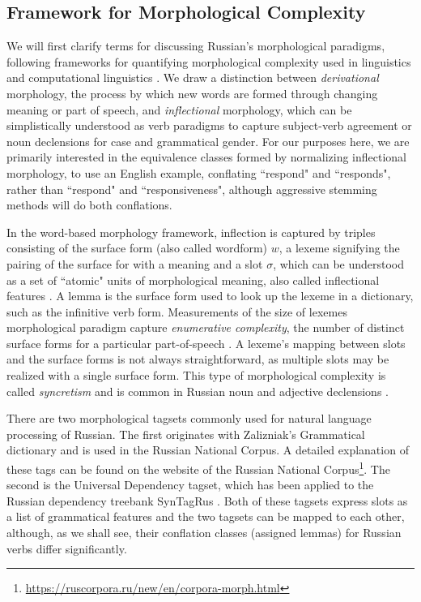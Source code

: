 \documentclass[11pt,a4paper]{article}
\begin{document}
\subsection{Framework for Morphological Complexity}
We will first clarify terms for discussing Russian's morphological paradigms, following frameworks for quantifying morphological complexity used in linguistics and computational linguistics \cite{baerman2015intro, cotterell-etal-2019-complexity}. We draw a distinction between \textit{derivational} morphology, the process by which new words are formed through changing meaning or part of speech, and \textit{inflectional} morphology, which can be simplistically understood as verb paradigms to capture subject-verb agreement or noun declensions for case and grammatical gender. For our purposes here, we are primarily interested in the equivalence classes formed by normalizing inflectional morphology, to use an English example, conflating ``respond" and ``responds", rather than ``respond" and ``responsiveness", although aggressive stemming methods will do both conflations.

In the word-based morphology framework, inflection is captured by triples consisting of the surface form (also called wordform) $w$, a lexeme  signifying the pairing of the surface for with a meaning and a slot $\sigma$, which can be understood as a set of ``atomic" units of morphological meaning, also called inflectional features \cite{aronoff1976word,sylak-glassman-etal-2015-language,cotterell-etal-2019-complexity}.
A lemma is the surface form used to look up the lexeme in a dictionary, such as the infinitive verb form. Measurements of the size of lexemes morphological paradigm capture \textit{enumerative complexity}, the number of distinct surface forms for a particular part-of-speech \cite{cotterell-etal-2019-complexity}. A lexeme's mapping between slots and the surface forms is not always straightforward, as multiple slots may be realized with a single surface form.  This type of morphological complexity is called \textit{syncretism} and is common in Russian noun and adjective declensions \cite{baerman2015understanding,Milizia2015PatternsOS}.

There are two morphological tagsets commonly used for natural language processing of Russian. The first originates with Zalizniak's Grammatical dictionary and is used in the Russian National Corpus. A detailed explanation of these tags can be found on the website of the Russian National Corpus\footnote{\url{https://ruscorpora.ru/new/en/corpora-morph.html}}. The second is the Universal Dependency tagset, which has been applied to the Russian dependency treebank SynTagRus \cite{Sharoff2011ThePP,lipenkova-soucek-2014-converting,mcdonald-etal-2013-universal}. Both of these tagsets express slots as a list of grammatical features and the two tagsets can be mapped to each other, although, as we shall see, their conflation classes (assigned lemmas) for Russian verbs differ significantly.
\end{document}
